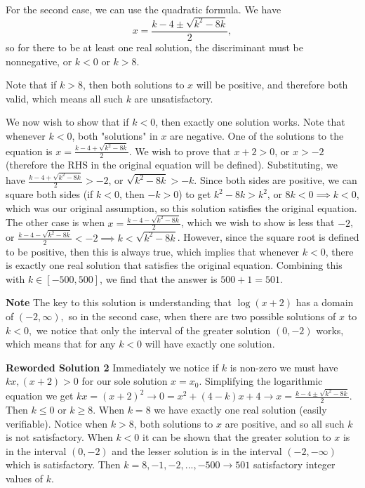 \begin{enumerate}
 For the second case, we can use the quadratic formula. We have 
 \[x = \frac{k-4 \pm \sqrt{k^2-8k}}2,\] so for there to be at least one real solution, the discriminant must be nonnegative, or $k < 0$ or $k > 8$. 

 Note that if $k > 8$, then both solutions to $x$ will be positive, and therefore both valid, which means all such $k$ are unsatisfactory. 

 We now wish to show that if $k < 0$, then exactly one solution works. Note that whenever $k < 0$, both "solutions" in $x$ are negative. One of the solutions to the equation is $x = \frac{k-4 + \sqrt{k^2-8k}}2$. We wish to prove that $x + 2 > 0$, or $x > -2$ (therefore the RHS in the original equation will be defined). Substituting, we have $\frac{k-4 + \sqrt{k^2-8k}}2 > -2$, or $\sqrt{k^2 - 8k} > -k$. Since both sides are positive, we can square both sides (if $k < 0$, then $-k > 0$) to get $k^2-8k > k^2$, or $8k < 0 \implies k < 0$, which was our original assumption, so this solution satisfies the original equation. The other case is when $x = \frac{k-4 - \sqrt{k^2-8k}}2$, which we wish to show is less that $-2$, or $\frac{k-4 - \sqrt{k^2-8k}}2 < -2 \implies k < \sqrt{k^2-8k}$. However, since the square root is defined to be positive, then this is always true, which implies that whenever $k < 0$, there is exactly one real solution that satisfies the original equation. Combining this with $k \in [-500, 500]$, we find that the answer is $500 + 1 = \boxed{501}$.

 \textbf{Note} The key to this solution is understanding that $\log(x+2)$ has a domain of $(-2, \infty),$ so in the second case, when there are two possible solutions of $x$ to $k<0,$ we notice that only the interval of the greater solution $(0,-2)$ works, which means that for any $k<0$ will have exactly one solution.

 \textbf{Reworded Solution 2} Immediately we notice if $k$ is non-zero we must have $kx, (x+2) > 0$ for our sole solution $x = x_0$. Simplifying the logarithmic equation we get $kx = (x+2)^2 \rightarrow 0 = x^2 + (4-k)x + 4 \rightarrow x = \frac{k-4 \pm \sqrt{k^2 - 8k}}{2}$. Then $k \leq 0$ or $k \geq 8$. When $k = 8$ we have exactly one real solution (easily verifiable). Notice when $k > 8$, both solutions to $x$ are positive, and so all such $k$ is not satisfactory. When $k < 0$ it can be shown that the greater solution to $x$ is in the interval $(0,-2)$ and the lesser solution is in the interval $(-2,-\infty)$ which is satisfactory. Then $k = 8,-1,-2,...,-500 \rightarrow \boxed{501}$ satisfactory integer values of $k$.


\end{enumerate}
